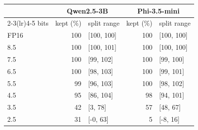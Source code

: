 \begin{tabular}{lrlrl}
\toprule
 & \multicolumn{2}{c}{Qwen2.5-3B} & \multicolumn{2}{c}{Phi-3.5-mini} \\
\cmidrule(lr){2-3}\cmidrule(lr){4-5}
bits & kept (\%) & split range & kept (\%) & split range \\
\midrule
FP16 & 100 & [100, 100] & 100 & [100, 100] \\
8.5 & 100 & [100, 101] & 100 & [100, 100] \\
7.5 & 100 & [99, 102] & 100 & [99, 100] \\
6.5 & 100 & [98, 103] & 100 & [99, 101] \\
5.5 & 99 & [96, 103] & 100 & [98, 102] \\
4.5 & 95 & [86, 104] & 98 & [94, 101] \\
3.5 & 42 & [3, 78] & 57 & [48, 67] \\
2.5 & 31 & [-0, 63] & 5 & [-8, 16] \\
\bottomrule
\end{tabular}
